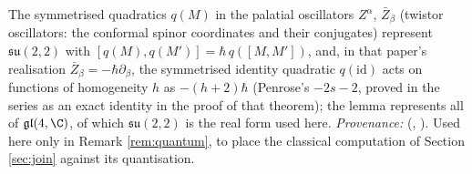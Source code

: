 The symmetrised quadratics $q(M)$ in the palatial oscillators $Z^\alpha$, $\bar Z_\beta$ (twistor oscillators: the conformal spinor coordinates and their conjugates) represent $\mathfrak{su}(2,2)$ with $[q(M), q(M')] = \hbar\, q([M,M'])$, and, in that paper's realisation $\bar{Z}_{\beta} = -\hbar\partial_{\beta}$, the symmetrised identity quadratic $q(\mathrm{id})$ acts on functions of homogeneity $h$ as $-(h+2)\hbar$ (Penrose's $-2s-2$, proved in the series as an exact identity in the proof of that theorem); the lemma represents all of $\mathfrak{gl}(4,\C)$, of which $\mathfrak{su}(2,2)$ is the real form used here. \emph{Provenance:} \cite[Lem.~5.5, Thm.~5.7]{ButlerT9} (, ). Used here only in Remark \ref{rem:quantum}, to place the classical computation of Section \ref{sec:join} against its quantisation.
